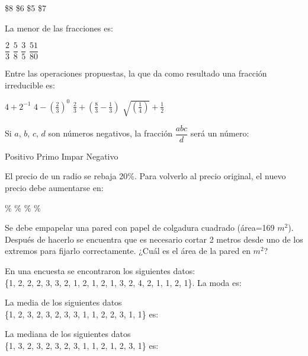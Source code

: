 \documentclass[10pt,letterpaper,addpoints]{exam}
\begin{document}
\begin{multicols}{2}
\begin{questions}
\begin{oneparchoices}
\choice \$8
\choice \$6
\CorrectChoice \$5
\choice \$7
\end{oneparchoices}
\question La menor de las fracciones es:

\begin{oneparchoices}
\choice $\dfrac{2}{3}$
\choice $\dfrac{5}{8}$
\CorrectChoice $\dfrac{3}{5}$
\choice $\dfrac{51}{80}$
\end{oneparchoices}
\question Entre las operaciones propuestas, la que da como resultado una fracción irreducible es:
\begin{choices}
\CorrectChoice $4+2^{-1}$
\choice $4-(\frac{2}{3})^{0}$
\choice $\frac{2}{3}+(\frac{8}{3}-\frac{1}{3})$
\choice $\sqrt{(\frac{1}{4})}+\frac{1}{2}$
\end{choices}
\question Si $a$, $b$, $c$, $d$ son números negativos, la fracción $\dfrac{abc}{d}$ será un número:

\begin{choices}
\CorrectChoice Positivo
\choice Primo
\choice Impar
\choice Negativo
\end{choices}
\question El precio de un radio se rebaja 20\%. Para volverlo al precio original, el nuevo precio debe aumentarse en:

\begin{oneparchoices}
\%
\%
\%
\%
\end{oneparchoices}
\question Se debe empapelar una pared con papel de colgadura cuadrado (área=169 $m^{2}$). Después de hacerlo se encuentra que es necesario cortar 2 metros desde uno de los extremos para fijarlo correctamente. ¿Cuál es el área de la pared en $m^{2}$?

\begin{oneparchoices}
\end{oneparchoices}
\question En una encuesta se encontraron los siguientes datos:\\ \{1, 2, 2, 2, 3, 3, 2, 1, 2, 1, 2, 1, 3, 2, 4, 2, 1, 1, 2, 1\}. La moda es:

\begin{oneparchoices}
\end{oneparchoices}
\question La media de los siguientes datos\\ \{1, 2, 3, 2, 3, 2, 3, 3, 1, 1, 2, 2, 3, 1, 1\} es:

\begin{oneparchoices}
\end{oneparchoices}
\question La mediana de los siguientes datos\\ \{1, 3, 2, 3, 2, 3, 2, 3, 1, 1, 2, 1, 2, 3, 1\} es:


\end{questions}
\end{multicols}
\end{document}
